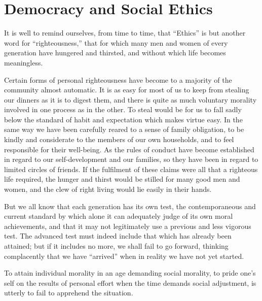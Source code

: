 
\author{Jane Addams}
\chapter[Democracy and Social Ethics, chap. 1]{Democracy and Social Ethics}


It is well to remind ourselves, from time to time, that
``Ethics'' is but another word for ``righteousness,'' that for which
many men and women of every generation have hungered and thirsted, and
without which life becomes meaningless.

Certain forms of personal righteousness have become to a majority of
the community almost automatic. It is as easy for most of us to keep
from stealing our dinners as it is to digest them, and there is quite
as much voluntary morality involved in one process as in the other. To
steal would be for us to fall sadly below the standard of habit and
expectation which makes virtue easy. In the same way we have been
carefully reared to a sense  of family obligation, to be
kindly and considerate to the members of our own households, and to
feel responsible for their well-being. As the rules of conduct have
become established in regard to our self-development and our families,
so they have been in regard to limited circles of friends. If the
fulfilment of these claims were all that a righteous life required,
the hunger and thirst would be stilled for many good men and women,
and the clew of right living would lie easily in their hands.

But we all know that each generation has its own test, the
contemporaneous and current standard by which alone it can adequately
judge of its own moral achievements, and that it may not legitimately
use a previous and less vigorous test. The advanced test must indeed
include that which has already been attained; but if it includes no
more, we shall fail to go forward, thinking complacently that we have
``arrived'' when in reality we have not yet started.

To attain individual morality in an age  demanding social
morality, to pride one's self on the results of personal effort when
the time demands social adjustment, is utterly to fail to apprehend
the situation.

